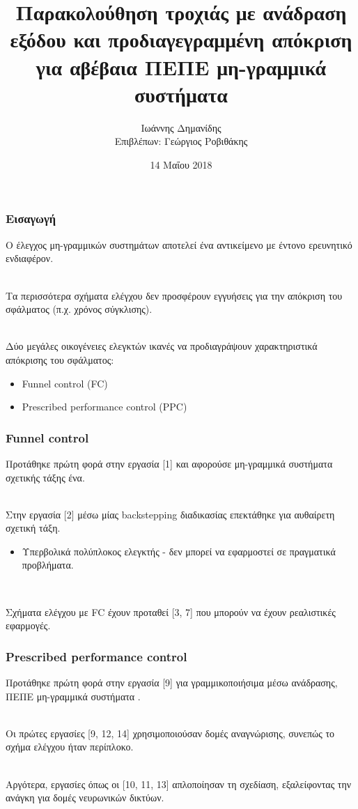 \documentclass{beamer}
\title{Παρακολούθηση τροχιάς με ανάδραση εξόδου και προδιαγεγραμμένη απόκριση για αβέβαια ΠΕΠΕ μη-γραμμικά συστήματα}
\author{{\large Ιωάννης Δημανίδης}\\ Επιβλέπων: Γεώργιος Ροβιθάκης}
\institute[ΑΠΘ]{ΑΡΙΣΤΟΤΕΛΕΙΟ ΠΑΝΕΠΙΣΤΗΜΙΟ ΘΕΣΣΑΛΟΝΙΚΗΣ\\
                Τμήμα Ηλεκτρολογων Μηχανικών \& Μηχανικών Υπολογιστών}
\date{14 Μαΐου 2018}
\begin{document}
    
    \frame{\titlepage}
        
    \begin{frame}
        \frametitle{Εισαγωγή}
        Ο έλεγχος μη-γραμμικών συστημάτων αποτελεί ένα αντικείμενο με έντονο ερευνητικό ενδιαφέρον.\\~\
        
        \pause
        Τα περισσότερα σχήματα ελέγχου δεν προσφέρουν εγγυήσεις για την απόκριση του σφάλματος (π.χ. χρόνος σύγκλισης).\\~\
        
        \pause
        Δύο μεγάλες οικογένειες ελεγκτών ικανές να προδιαγράψουν χαρακτηριστικά απόκρισης του σφάλματος:
        \begin{itemize}
            \item \textlatin{Funnel control (FC)} 
            \item \textlatin{Prescribed performance control (PPC)}
        \end{itemize}
    \end{frame}

    \begin{frame}
        \frametitle{\textlatin{Funnel control}}
        Προτάθηκε πρώτη φορά στην εργασία [1] και αφορούσε μη-γραμμικά συστήματα σχετικής τάξης ένα.\\~\
        
        \pause
        Στην εργασία [2] μέσω μίας \textlatin{backstepping} διαδικασίας επεκτάθηκε για αυθαίρετη σχετική τάξη.
        \pause
        \begin{itemize}
            \item Υπερβολικά πολύπλοκος ελεγκτής - δεν μπορεί να εφαρμοστεί σε πραγματικά προβλήματα.
        \end{itemize}~\
    
        \pause
        Σχήματα ελέγχου με \textlatin{FC} έχουν προταθεί [3, 7] που μπορούν να έχουν ρεαλιστικές εφαρμογές.
    \end{frame}

    \begin{frame}
        \frametitle{\textlatin{Prescribed performance control}}
        Προτάθηκε πρώτη φορά στην εργασία [9] για γραμμικοποιήσιμα μέσω ανάδρασης, ΠΕΠΕ μη-γραμμικά συστήματα .\\~\
        
        \pause
        Οι πρώτες εργασίες [9, 12, 14] χρησιμοποιούσαν δομές αναγνώρισης, συνεπώς το σχήμα ελέγχου ήταν περίπλοκο.\\~\
        
        \pause
        Αργότερα, εργασίες όπως οι [10, 11, 13] απλοποίησαν τη σχεδίαση, εξαλείφοντας την ανάγκη για δομές νευρωνικών δικτύων.
    \end{frame}
\end{document}
